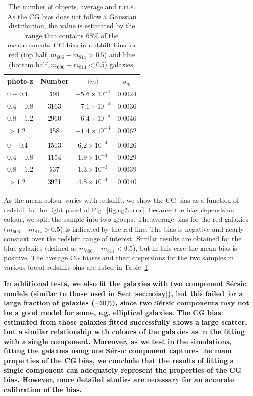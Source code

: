 \documentclass[useAMS,usenatbib]{mnras}
\begin{document}
\begin{table}
\begin{center}
  \begin{tabular}{lccc}
    \hline
    photo-z    &Number &$\langle m\rangle$  &$\sigma_m$ \\
    \hline
    $0-0.4$    &399  &$-5.6\times10^{-4}$  &$0.0024$\\
    $0.4-0.8$  &3163 &$-7.1\times10^{-4}$  &$0.0036$\\
    $0.8-1.2$  &2960 &$-6.4\times10^{-4}$  &$0.0046$\\
    $>1.2$     &958  &$-1.4\times10^{-3}$  &$0.0062$\\
    \\
    $0-0.4$  &1513  &$6.2\times10^{-4}$  &$0.0026$\\
    $0.4-0.8$ &1154  &$1.9\times10^{-4}$  &$0.0029$\\
    $0.8-1.2$ &537  &$1.3\times10^{-3}$  &$0.0039$\\
    $>1.2$  & 3921  &$4.8\times10^{-4}$  &$0.0040$\\
    \hline
  \end{tabular}
  \caption{The number of objects, average and r.m.s. As the CG bias does not follow a Gaussian distribution, the value is estimated by the range that contains $68 \% $ of the measurements. CG bias in redshift bins for red (top half, $m_{606}-m_{814}>0.5$) and blue (bottom half, $m_{606}-m_{814}<0.5$) galaxies. }
  \label{table:calibration}
\end{center}
\end{table}

As the mean colour varies with redshift, we show the CG bias as a function of redshift in the right panel of
Fig.~\ref{fig:cg2color}.  Because the bias depends on colour, we split the sample into two groups. The average bias for the red galaxies ($m_{606}-m_{814}>0.5$) is indicated by the red line. The bias is negative and nearly constant over the redshift range of interest. Similar results are obtained for the blue galaxies
(defined as $m_{606}-m_{814}<0.5$), but in this case the mean bias is positive. The average CG biases and their dispersions for the two samples in various broad redshift bins are listed in Table~\ref{table:calibration}.

{\bf In additional tests, we also fit the galaxies with two component S{\'e}rsic models (similar to those used in Sect\,\ref{sec:noisy}), but this failed for a large fraction of galaxies ($\sim30\%$), since two S{\'e}rsic components may not be a good model for some, e.g. elliptical galaxies. The CG bias estimated from those galaxies fitted successfully shows a large scatter, but a similar relationship with colours of the galaxies as in the fitting with a single component. Moreover, as we test in the simulations, fitting the galaxies using one S{\'e}rsic component captures the main properties of the CG bias, we conclude that the results of fitting a single component can adequately represent the properties of the CG bias. However, more detailed studies are necessary for an accurate calibration of the bias. }
\end{document}
